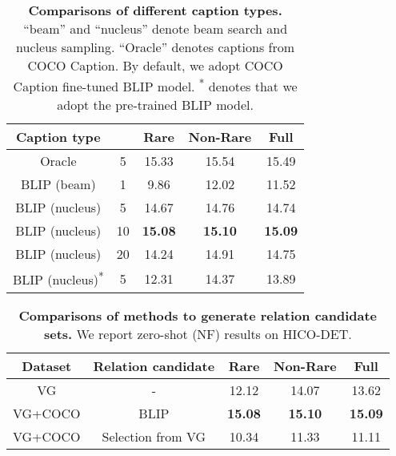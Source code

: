 {\renewcommand{\arraystretch}{0.9}
\begin{table}[t]
  \small
  \setlength{\tabcolsep}{7.5pt}
  \centering
    \begin{tabular}{cc|ccc}
    \toprule
    \textbf{Caption type} &  & \textbf{Rare} & \textbf{Non-Rare} & \textbf{Full} \\
    \midrule
    \midrule
    Oracle & 5     & 15.33  & 15.54  & 15.49  \\
    \midrule
    BLIP (beam) & 1     & 9.86  & 12.02  & 11.52  \\
    BLIP (nucleus) & 5     & 14.67  & 14.76  & 14.74  \\
    BLIP (nucleus) & 10    & \textbf{15.08} & \textbf{15.10} & \textbf{15.09} \\
    BLIP (nucleus) & 20    & 14.24  & 14.91  & 14.75  \\
    \midrule
    BLIP (nucleus)\textsuperscript{*} & 5     & 12.31  & 14.37  & 13.89  \\
    \bottomrule
    \end{tabular}
    \vspace{-.1cm}
    \caption{\small \textbf{Comparisons of different caption types.} ``beam'' and ``nucleus'' denote beam search and nucleus sampling. ``Oracle'' denotes captions from COCO Caption. By default, we adopt COCO Caption fine-tuned BLIP model. \textsuperscript{*} denotes that we adopt the pre-trained BLIP model.}
    \vspace{-.2cm}
  \label{tab:caption_type}
\end{table}}

{\renewcommand{\arraystretch}{0.9}
\begin{table}[t]
  \small
  \setlength{\tabcolsep}{3.8pt}
  \centering
    \begin{tabular}{cc|ccc}
    \toprule
    \textbf{Dataset} & \textbf{Relation candidate} & \textbf{Rare} & \textbf{Non-Rare} & \textbf{Full} \\
    \midrule
    \midrule
    VG    & -     & 12.12  & 14.07  & 13.62  \\
    \midrule
    VG+COCO & BLIP  & \textbf{15.08}  & \textbf{15.10}  & \textbf{15.09}  \\
    VG+COCO & Selection from VG & 10.34  & 11.33  & 11.11  \\
    \bottomrule
    \end{tabular}
    \vspace{-.1cm}
    \caption{\small \textbf{Comparisons of methods to generate relation candidate sets.} We report zero-shot (NF) results on HICO-DET.}
    \vspace{-.2cm}
  \label{tab:necessity_of_BLIP}
\end{table}}

